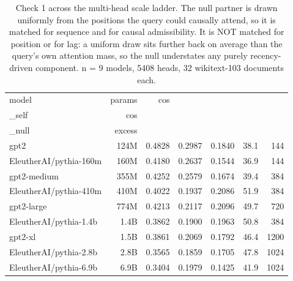 \begin{table}[t]
  \centering
  \caption{Check 1 across the multi-head scale ladder. The null partner is drawn uniformly from the positions the query could causally attend, so it is matched for sequence and for causal admissibility. It is NOT matched for position or for lag: a uniform draw sits further back on average than the query's own attention mass, so the null understates any purely recency-driven component. n = 9 models, 5408 heads, 32 wikitext-103 documents each.}
  \label{tab:t1}
  \begin{tabular}{lrrrrrr}
    \toprule
    model & params & cos\\_self & cos\\_null & excess & \\%
    \midrule
    gpt2 & 124M & 0.4828 & 0.2987 & 0.1840 & 38.1 & 144 \\
    EleutherAI/pythia-160m & 160M & 0.4180 & 0.2637 & 0.1544 & 36.9 & 144 \\
    gpt2-medium & 355M & 0.4252 & 0.2579 & 0.1674 & 39.4 & 384 \\
    EleutherAI/pythia-410m & 410M & 0.4022 & 0.1937 & 0.2086 & 51.9 & 384 \\
    gpt2-large & 774M & 0.4213 & 0.2117 & 0.2096 & 49.7 & 720 \\
    EleutherAI/pythia-1.4b & 1.4B & 0.3862 & 0.1900 & 0.1963 & 50.8 & 384 \\
    gpt2-xl & 1.5B & 0.3861 & 0.2069 & 0.1792 & 46.4 & 1200 \\
    EleutherAI/pythia-2.8b & 2.8B & 0.3565 & 0.1859 & 0.1705 & 47.8 & 1024 \\
    EleutherAI/pythia-6.9b & 6.9B & 0.3404 & 0.1979 & 0.1425 & 41.9 & 1024 \\
    \bottomrule
  \end{tabular}
\end{table}
